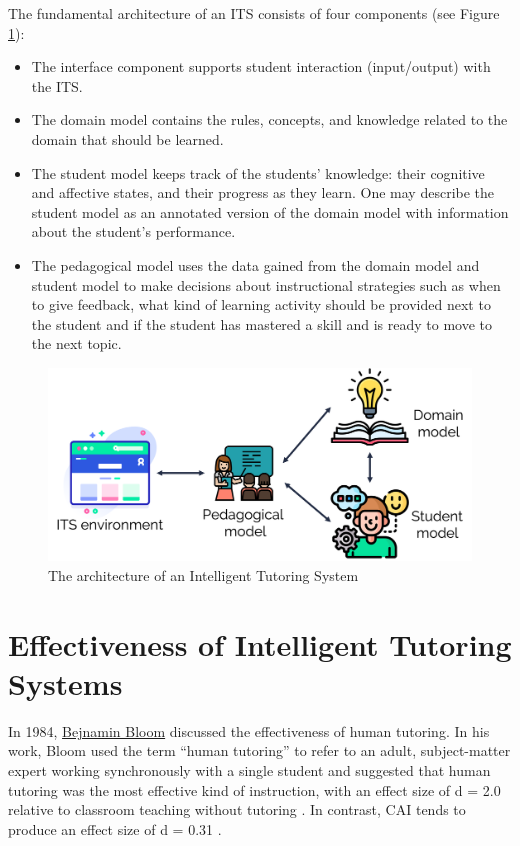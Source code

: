 \documentclass[
]{book}
\providecommand{\tightlist}{%
  \setlength{\itemsep}{0pt}\setlength{\parskip}{0pt}}
\begin{document}
The fundamental architecture of an ITS consists of four components (see Figure \ref{fig:itsarchitecture}):

\begin{itemize}
\tightlist
\item
  The interface component supports student interaction (input/output) with the ITS.
\item
  The domain model contains the rules, concepts, and knowledge related to the domain that should be learned.
\item
  The student model keeps track of the students' knowledge: their cognitive and affective states, and their progress as they learn. One may describe the student model as an annotated version of the domain model with information about the student's performance.
\item
  The pedagogical model uses the data gained from the domain model and student model to make decisions about instructional strategies such as when to give feedback, what kind of learning activity should be provided next to the student and if the student has mastered a skill and is ready to move to the next topic.
\end{itemize}

\begin{figure}
\includegraphics[width=13cm]{./images/ITSarchitecture} \caption{The architecture of an Intelligent Tutoring System}\label{fig:itsarchitecture}
\end{figure}

\section{Effectiveness of Intelligent Tutoring Systems}\label{effectiveness-of-intelligent-tutoring-systems}

In 1984, \href{https://en.wikipedia.org/wiki/Benjamin_Bloom}{Bejnamin Bloom} discussed the effectiveness of human tutoring. In his work, Bloom used the term ``human tutoring'' to refer to an adult, subject-matter expert working synchronously with a single student and suggested that human tutoring was the most effective kind of instruction, with an effect size of d = 2.0 relative to classroom teaching without tutoring \citep{bloom19842}. In contrast, CAI tends to produce an effect size of d = 0.31 \citep{kulik1991effectiveness}.
\end{document}
